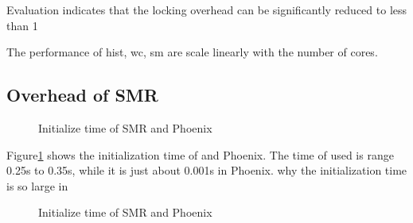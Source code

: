 {\color{red}\myds }
Evaluation indicates that
the locking overhead can be significantly reduced to less
than 1%





The performance of hist, wc, sm are scale linearly with the number of cores.


\subsection{Overhead of SMR}
\begin{figure}[htpb]
\centering
  \caption{Initialize time of SMR and Phoenix}
   \label{fig:init}
\end{figure}
Figure\ref{fig:init} shows the initialization time of \myds and Phoenix.
The time of \myds used is range 0.25s to  0.35s, 
while it is just about 0.001s in Phoenix.
{\color{red} why the initialization time is so large in \myds}

\begin{figure}[htpb]
\centering
  \caption{Initialize time of SMR and Phoenix}
   \label{fig:time}
\end{figure}





